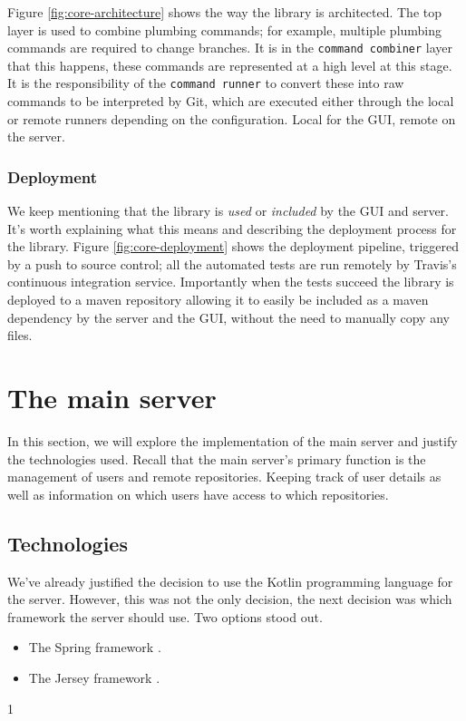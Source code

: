Figure \ref{fig:core-architecture} shows the way the library is architected. The top layer is used to combine plumbing commands; for example, multiple plumbing commands are required to change branches. It is in the \texttt{command combiner} layer that this happens, these commands are represented at a high level at this stage. It is the responsibility of the \texttt{command runner} to convert these into raw commands to be interpreted by Git, which are executed either through the local or remote runners depending on the configuration. Local for the GUI, remote on the server.



\subsubsection{Deployment}

We keep mentioning that the library is \emph{used} or \emph{included} by the GUI and server. It's worth explaining what this means and describing the deployment process for the library. Figure \ref{fig:core-deployment} shows the deployment pipeline, triggered by a push to source control; all the automated tests are run remotely by Travis's continuous integration service. Importantly when the tests succeed the library is deployed to a maven repository allowing it to easily be included as a maven dependency by the server and the GUI, without the need to manually copy any files.


\section{The main server}
In this section, we will explore the implementation of the main server and justify the technologies used. Recall that the main server's primary function is the management of users and remote repositories. Keeping track of user details as well as information on which users have access to which repositories. 

\subsection{Technologies}

We've already justified the decision to use the Kotlin programming language for the server. However, this was not the only decision, the next decision was which framework the server should use. Two options stood out.

\begin{itemize}
\item The Spring framework \cite{spring}.
\item The Jersey framework \cite{jersey}.
\end{itemize}
1